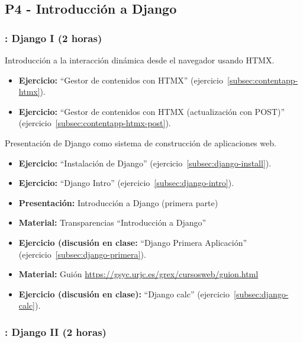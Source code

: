 \documentclass[a4paper,12pt]{article}
\begin{document}
\subsection{P4 - Introducción a Django}

\subsubsection{\martesG: Django I (2 horas)}
\label{cal:martesG}

Introducción a la interacción dinámica desde el navegador usando HTMX.

\begin{itemize}
\item \textbf{Ejercicio:} ``Gestor de contenidos con HTMX'' (ejercicio~\ref{subsec:contentapp-htmx}).
\item \textbf{Ejercicio:} ``Gestor de contenidos con HTMX (actualización con POST)'' (ejercicio~\ref{subsec:contentapp-htmx-post}).
\end{itemize}

Presentación de Django como sistema de construcción de aplicaciones web.

\begin{itemize}
 \item \textbf{Ejercicio:} ``Instalación de Django'' (ejercicio~\ref{subsec:django-install}).
 \item \textbf{Ejercicio:} ``Django Intro'' (ejercicio~\ref{subsec:django-intro}).
 \item \textbf{Presentación:} Introducción a Django (primera parte)
 \item \textbf{Material:} Transparencias ``Introducción a Django''
 \item \textbf{Ejercicio (discusión en clase:} ``Django Primera Aplicación'' (ejercicio~\ref{subsec:django-primera}).
 \item \textbf{Material:} Guión \url{https://gsyc.urjc.es/grex/cursosweb/guion.html}
 \item \textbf{Ejercicio (discusión en clase):} ``Django calc'' (ejercicio~\ref{subsec:django-calc}).
 \end{itemize}


\subsubsection{\martesH: Django II (2 horas)}
\label{cal:martesH}
\end{document}
